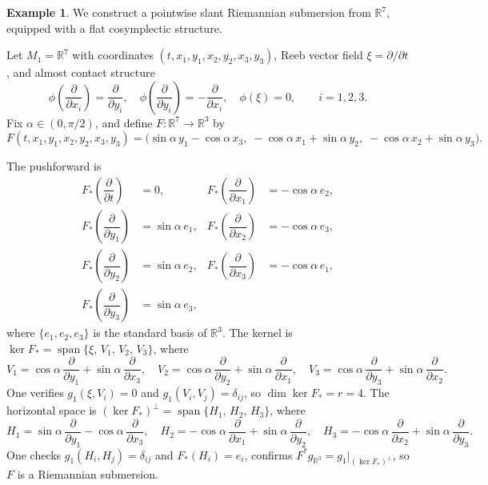 \documentclass[11pt]{amsart}
\theoremstyle{plain}
\theoremstyle{definition}
\newtheorem{example}{Example}[section]
\theoremstyle{remark}
\DeclareMathOperator{\Span}{span}
\newcommand{\R}{\mathbb{R}}
\begin{document}
\begin{example}\label{ex:subm1}
We construct a pointwise slant Riemannian submersion 
from $\R^7$, equipped with a flat cosymplectic structure.

Let $M_1 = \R^7$ with coordinates 
$(t, x_1, y_1, x_2, y_2, x_3, y_3)$, Reeb vector 
field $\xi = \partial/\partial t$, and almost contact 
structure
\[
\phi\!\left(\dfrac{\partial}{\partial x_i}\right) 
= \dfrac{\partial}{\partial y_i}, \quad
\phi\!\left(\dfrac{\partial}{\partial y_i}\right) 
= -\dfrac{\partial}{\partial x_i}, \quad
\phi(\xi) = 0, \qquad i = 1,2,3.
\]
Fix $\alpha \in (0, \pi/2)$, and define 
$F : \R^7 \to \R^3$ by
\begin{equation}\label{eq:ex3_map}
F(t, x_1, y_1, x_2, y_2, x_3, y_3) 
= \bigl(\sin\alpha\, y_1 - \cos\alpha\, x_3,\;
  -\cos\alpha\, x_1 + \sin\alpha\, y_2,\;
  -\cos\alpha\, x_2 + \sin\alpha\, y_3\bigr).
\end{equation}


The pushforward is
\begin{align*}
F_*\!\left(\dfrac{\partial}{\partial t}\right) 
&= 0, &
F_*\!\left(\dfrac{\partial}{\partial x_1}\right) 
&= -\cos\alpha\, e_2, \\
F_*\!\left(\dfrac{\partial}{\partial y_1}\right) 
&= \sin\alpha\, e_1, &
F_*\!\left(\dfrac{\partial}{\partial x_2}\right) 
&= -\cos\alpha\, e_3, \\
F_*\!\left(\dfrac{\partial}{\partial y_2}\right) 
&= \sin\alpha\, e_2, &
F_*\!\left(\dfrac{\partial}{\partial x_3}\right) 
&= -\cos\alpha\, e_1, \\
F_*\!\left(\dfrac{\partial}{\partial y_3}\right) 
&= \sin\alpha\, e_3, & &
\end{align*}
where $\{e_1, e_2, e_3\}$ is the standard basis of 
$\R^3$. The kernel is
$\ker F_* = \Span\{\xi,\, V_1,\, V_2,\, V_3\}$,
where
\begin{equation}\label{eq:ex3_vertical}
V_1 = \cos\alpha\,
  \dfrac{\partial}{\partial y_1} 
  + \sin\alpha\,
  \dfrac{\partial}{\partial x_3}, \quad
V_2 = \cos\alpha\,
  \dfrac{\partial}{\partial y_2} 
  + \sin\alpha\,
  \dfrac{\partial}{\partial x_1}, \quad
V_3 = \cos\alpha\,
  \dfrac{\partial}{\partial y_3} 
  + \sin\alpha\,
  \dfrac{\partial}{\partial x_2}.
\end{equation}
One verifies $g_1(\xi, V_i) = 0$ and 
$g_1(V_i, V_j) = \delta_{ij}$, so 
$\dim\ker F_* = r = 4$. The horizontal space is
$(\ker F_*)^\perp = \Span\{H_1,\, H_2,\, H_3\}$,
where
\begin{equation}\label{eq:ex3_horizontal}
H_1 = \sin\alpha\,
  \dfrac{\partial}{\partial y_1} 
  - \cos\alpha\,
  \dfrac{\partial}{\partial x_3}, \quad
H_2 = -\cos\alpha\,
  \dfrac{\partial}{\partial x_1} 
  + \sin\alpha\,
  \dfrac{\partial}{\partial y_2}, \quad
H_3 = -\cos\alpha\,
  \dfrac{\partial}{\partial x_2} 
  + \sin\alpha\,
  \dfrac{\partial}{\partial y_3}.
\end{equation}
One checks $g_1(H_i, H_j) = \delta_{ij}$ and 
$F_*(H_i) = e_i$, confirms
$F^*g_{\R^3} = g_1|_{(\ker F_*)^\perp}$, 
so $F$ is a Riemannian submersion.



\end{example}
\end{document}
